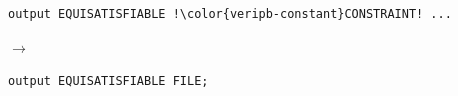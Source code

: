 \documentclass[a4paper]{article}
\newcommand{\veriPB}[0]{\textsc{VeriPB}}
\begin{document}
\begin{itemize}
\begin{minipage}{.47\linewidth}
\begin{lstlisting}[language=veripb, gobble=8, rulecolor=\color{veripb-invalid-text}, caption={\veriPB{} 2.0 syntax.}]
		output EQUISATISFIABLE !\color{veripb-constant}CONSTRAINT! ...
		\end{lstlisting}
	      \end{minipage}\hfill%
	      \begin{minipage}[t]{.05\linewidth}
		      \centering \vspace*{-5mm}$\to$
	      \end{minipage}\hfill%
	      \hfill%
	      \begin{minipage}{.47\linewidth}
		      \begin{lstlisting}[language=veripb, gobble=8, rulecolor=\color{veripb-valid-text}, caption={\veriPB{} 3.0 syntax.}]
		output EQUISATISFIABLE FILE;
		\end{lstlisting}
	      \end{minipage}
\end{itemize}
\end{document}
